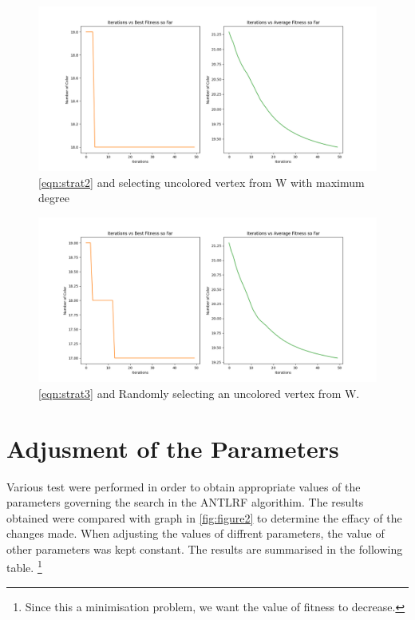 \documentclass[a4paper]{article}
\begin{document}
    
    
\begin{center}
\begin{figure}[h]
\centering
\includegraphics[width=12cm]{Figures/fig5.png}
\caption{\ref{eqn:strat2} and selecting uncolored vertex from W with maximum degree}
\end{figure}
\end{center}
    

\newpage 
\begin{center}
\begin{figure}[h]
\centering
\includegraphics[width=12cm]{Figures/fig6.png}
\caption{\ref{eqn:strat3} and Randomly selecting an uncolored vertex from W.}
\end{figure}
\end{center}
    

\section*{Adjusment of the Parameters}
Various test were performed in order to obtain appropriate values of the parameters governing the search in the ANTLRF algorithim. 
The results obtained were compared with graph in \ref{fig:figure2} to determine the effacy of the changes made. When adjusting the values of diffrent parameters,
the value of other parameters was kept constant. The results are summarised in the following table. \footnote{Since this a minimisation problem, we want the value of fitness to decrease.}
\end{document}
